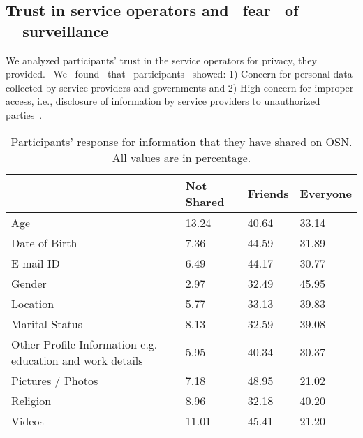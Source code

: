 		






\subsection{Trust in service operators and ~fear ~of ~~surveillance}
We analyzed participants' trust in the service operators for privacy, they provided. ~We ~found ~that ~participants ~showed: 1) Concern for personal data collected by service providers and governments and 2) High concern for improper access, i.e., disclosure of information by service providers to unauthorized parties~\cite{bellmaninternationaldifferences:2004}. 

\begin{table}[!htbp]
\vspace{-4mm}
\centering
\caption{\small{Participants' response for information that they have shared on OSN. All values are in percentage.}}
\small
\setlength{\extrarowheight}{2pt}
\begin{tabular}{ p{2.5cm} p{1.5cm}  p{1.0cm}  p{1.2cm} }
\midrule
\midrule          
& Not Shared & Friends & Everyone\\
\hline
      \rowcolor {gray!16 }
   Age   & 13.24 & 40.64  & 33.14  \\
Date of Birth & 7.36  & 44.59 & 31.89  \\
        \rowcolor {gray!16 }
    E mail ID & 6.49  & 44.17 & 30.77  \\
Gender & 2.97  & 32.49 & 45.95  \\
\rowcolor {gray!16 }
    Location & 5.77  & 33.13  & 39.83\\
Marital Status & 8.13  & 32.59 & 39.08  \\
\rowcolor {gray!16 }

\raggedright Other Profile Information e.g. education and work details & 5.95  & 40.34  & 30.37  \\


    Pictures / Photos & 7.18  & 48.95 & 21.02  \\
\rowcolor {gray!16 }
    Religion & 8.96  & 32.18 & 40.20  \\
Videos & 11.01 & 45.41 & 21.20 \\
    \midrule
    \hline
    \end{tabular}\vspace{-4mm}
    \label{tab:PIIOSN}
\end{table}



